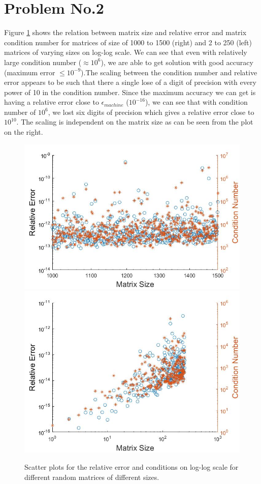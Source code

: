 \section*{Problem No.2} \label{sec:prob2}
Figure \ref{fig:sac} shows the relation between matrix size and relative error and matrix condition number for matrices of size of 1000 to 1500 (right) and 2 to 250 (left) matrices of varying sizes on log-log scale. We can see that even with relatively large condition number ($\approx 10^{6}$), we are able to get solution with good accuracy (maximum error $\leq 10^{-9}$).The scaling between the condition number and relative error appears to be such that there a single lose of a digit of precision with every power of 10 in the condition number. Since the maximum accuracy we can get is having a relative error close to $\epsilon_{machine}$ ($10^{-16}$), we can see that with condition number of $10^{6}$, we lost six digits of precision which gives a relative error close to $10^{10}$. The scaling is independent on the matrix size as can be seen from the plot on the right. 


\begin{figure}[tbh]
 \centering  
   {\includegraphics[width=0.48\linewidth]{code/prob2a.jpg}}   
   {\includegraphics[width=0.48\linewidth]{code/prob2b.jpg}}
  \caption{Scatter plots for the relative error and conditions on log-log scale for different random matrices of different sizes.}
   \label{fig:sac}
\end{figure} 